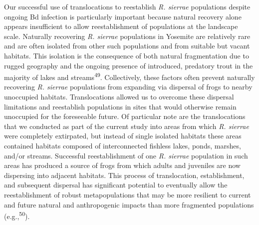 \documentclass[
  letterpaper,
  DIV=11,
  numbers=noendperiod]{scrartcl}
\begin{document}
Our successful use of translocations to reestablish \emph{R. sierrae}
populations despite ongoing Bd infection is particularly important
because natural recovery alone appears insufficient to allow
reestablishment of populations at the landscape scale. Naturally
recovering \emph{R. sierrae} populations in Yosemite are relatively rare
and are often isolated from other such populations and from suitable but
vacant habitats. This isolation is the consequence of both natural
fragmentation due to rugged geography and the ongoing presence of
introduced, predatory trout in the majority of lakes and
streams\textsuperscript{49}. Collectively, these factors often prevent
naturally recovering \emph{R. sierrae} populations from expanding via
dispersal of frogs to nearby unoccupied habitats. Translocations allowed
us to overcome these dispersal limitations and reestablish populations
in sites that would otherwise remain unoccupied for the foreseeable
future. Of particular note are the translocations that we conducted as
part of the current study into areas from which \emph{R. sierrae} were
completely extirpated, but instead of single isolated habitats these
areas contained habitats composed of interconnected fishless lakes,
ponds, marshes, and/or streams. Successful reestablishment of one
\emph{R. sierrae} population in such areas has produced a source of
frogs from which adults and juveniles are now dispersing into adjacent
habitats. This process of translocation, establishment, and subsequent
dispersal has significant potential to eventually allow the
reestablishment of robust metapopulations that may be more resilient to
current and future natural and anthropogenic impacts than more
fragmented populations (e.g.,\textsuperscript{50}).
\end{document}
